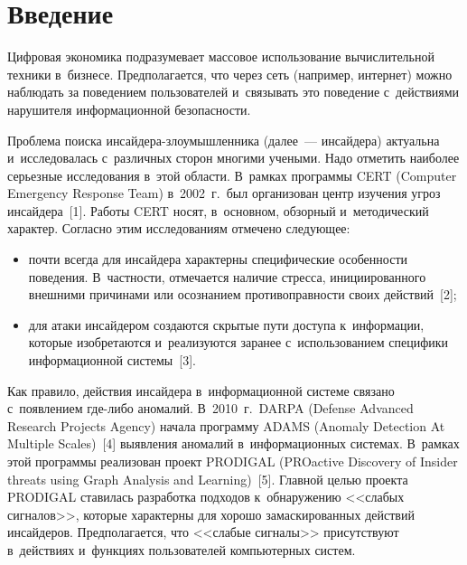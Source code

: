   



\thispagestyle{headings}

\begin{multicols}{2}

\label{st\stat}
  
\section{Введение}

  Цифровая экономика подразумевает массовое использование вычислительной 
техники в~бизнесе. Предполагается, что через сеть (например, интернет) можно 
наблюдать за поведением пользователей и~связывать это поведение с~действиями 
нарушителя информационной безопасности.
  
  Проблема поиска инсайдера-злоумышленника (далее~--- инсайдера) актуальна и~исследовалась с~различных сторон многими учеными. Надо отметить наиболее 
серьезные исследования в~этой области. В~рамках программы CERT 
(Computer Emergency Response Team)
в~2002~г.\ 
был организован центр изучения угроз инсайдера~[1]. Работы CERT носят, 
в~основном, обзорный и~методический характер. Согласно этим исследованиям 
отмечено следующее:
  \begin{itemize}
\item почти всегда для инсайдера характерны специфические особенности 
поведения. В~частности, отмечается наличие стресса, инициированного 
внешними причинами или осознанием противоправности своих действий~[2];
\item для атаки инсайдером создаются скрытые пути доступа к~информации, 
которые изобретаются и~реализуются заранее с~использованием специфики 
информационной системы~[3]. 
\end{itemize}

  Как правило, действия инсайдера в~информационной системе связано 
с~появлением где-ли\-бо аномалий. В~2010~г.\ DARPA (Defense Advanced Research
Projects Agency) начала программу 
ADAMS (Anomaly Detection At Multiple Scales)~[4] выявления аномалий 
в~информационных системах. В~рамках этой 
программы реализован проект PRODIGAL (PROactive Discovery of Insider threats using
Graph Analysis and Learning)~[5]. Главной целью проекта 
PRODIGAL ставилась разработка подходов к~обнаружению <<слабых сигналов>>, 
которые характерны для хорошо замаскированных действий инсайдеров. 
Предполагается, что <<слабые сигналы>> присутствуют в~действиях и~функциях 
пользователей компьютерных систем. 
  

\end{multicols}

